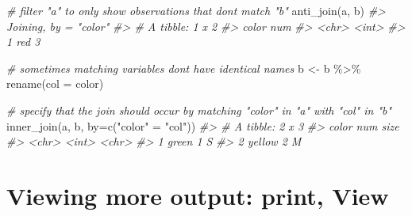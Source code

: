 \documentclass[
]{book}
\newenvironment{Shaded}{\begin{snugshade}}{\end{snugshade}}
\newcommand{\AttributeTok}[1]{\textcolor[rgb]{0.77,0.63,0.00}{#1}}
\newcommand{\CommentTok}[1]{\textcolor[rgb]{0.56,0.35,0.01}{\textit{#1}}}
\newcommand{\FunctionTok}[1]{\textcolor[rgb]{0.00,0.00,0.00}{#1}}
\newcommand{\NormalTok}[1]{#1}
\newcommand{\OtherTok}[1]{\textcolor[rgb]{0.56,0.35,0.01}{#1}}
\newcommand{\SpecialCharTok}[1]{\textcolor[rgb]{0.00,0.00,0.00}{#1}}
\newcommand{\StringTok}[1]{\textcolor[rgb]{0.31,0.60,0.02}{#1}}
\begin{document}
\begin{Shaded}
\begin{Highlighting}[]
\CommentTok{\# filter "a" to only show observations that don\textquotesingle{}t match "b"}
\FunctionTok{anti\_join}\NormalTok{(a, b)}
\CommentTok{\#\textgreater{} Joining, by = "color"}
\CommentTok{\#\textgreater{} \# A tibble: 1 x 2}
\CommentTok{\#\textgreater{}   color   num}
\CommentTok{\#\textgreater{}   \textless{}chr\textgreater{} \textless{}int\textgreater{}}
\CommentTok{\#\textgreater{} 1 red       3}
\end{Highlighting}
\end{Shaded}

\begin{Shaded}
\begin{Highlighting}[]
\CommentTok{\# sometimes matching variables don\textquotesingle{}t have identical names}
\NormalTok{b }\OtherTok{\textless{}{-}}\NormalTok{ b }\SpecialCharTok{\%\textgreater{}\%} \FunctionTok{rename}\NormalTok{(}\AttributeTok{col =}\NormalTok{ color)}

\CommentTok{\# specify that the join should occur by matching "color" in "a" with "col" in "b"}
\FunctionTok{inner\_join}\NormalTok{(a, b, }\AttributeTok{by=}\FunctionTok{c}\NormalTok{(}\StringTok{"color"} \OtherTok{=} \StringTok{"col"}\NormalTok{))}
\CommentTok{\#\textgreater{} \# A tibble: 2 x 3}
\CommentTok{\#\textgreater{}   color    num size }
\CommentTok{\#\textgreater{}   \textless{}chr\textgreater{}  \textless{}int\textgreater{} \textless{}chr\textgreater{}}
\CommentTok{\#\textgreater{} 1 green      1 S    }
\CommentTok{\#\textgreater{} 2 yellow     2 M}
\end{Highlighting}
\end{Shaded}

\hypertarget{viewing-more-output-print-view}{%
\section{Viewing more output: print, View}\label{viewing-more-output-print-view}}
\end{document}

